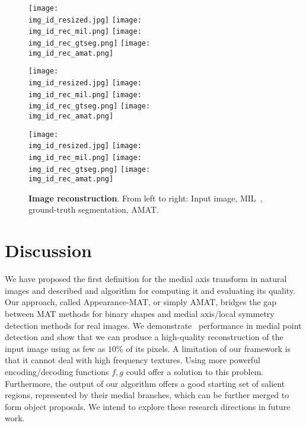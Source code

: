 \documentclass[10pt,twocolumn,letterpaper]{article}
\begin{document}
\begin{figure*}[t]
\centering
\def\imgw{0.24}

\def\img_id{145086}
\texttt{[image: \\img\_id\_resized.jpg]}
\texttt{[image: \\img\_id\_rec\_mil.png]}
\texttt{[image: \\img\_id\_rec\_gtseg.png]}
\texttt{[image: \\img\_id\_rec\_amat.png]}

\def\img_id{85048}
\texttt{[image: \\img\_id\_resized.jpg]}
\texttt{[image: \\img\_id\_rec\_mil.png]}
\texttt{[image: \\img\_id\_rec\_gtseg.png]}
\texttt{[image: \\img\_id\_rec\_amat.png]}

\def\img_id{42049}
\texttt{[image: \\img\_id\_resized.jpg]}
\texttt{[image: \\img\_id\_rec\_mil.png]}
\texttt{[image: \\img\_id\_rec\_gtseg.png]}
\texttt{[image: \\img\_id\_rec\_amat.png]}

\caption{\textbf{Image reconstruction}. From left to right: Input image, MIL~\cite{tsogkas2012learning}, ground-truth segmentation, AMAT.}
\label{fig:experiments:reconstruction}
\end{figure*}



\section{Discussion}\label{sec:discussion}
We have proposed the first definition for the medial axis transform in natural images and described and algorithm for
computing it and evaluating its quality.
Our approach, called Appearance-MAT, or simply AMAT, bridges the gap between MAT methods for binary shapes and 
medial axis/local symmetry detection methods for real images.
We demonstrate \sota\ performance in medial point detection and show that we can produce a high-quality 
reconstruction of the input image using as few as $10\%$ of its pixels. 
A limitation of our framework is that it cannot deal with high frequency textures.
Using more powerful encoding/decoding functions $f,g$ could offer a solution to this problem.
Furthermore, the output of our algorithm offers a good starting set of salient regions, represented by 
their medial branches, which can be further merged to form object proposals.
We intend to explore these research directions in future work.


{\small


}
\end{document}
